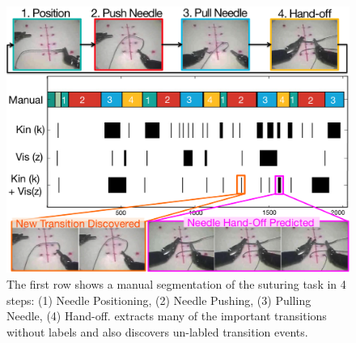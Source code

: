 
\begin{figure}[!ht]
    \centering
    \includegraphics[width=\linewidth]{tsc-experiments/suturing-v4}
    \caption{The first row shows a manual segmentation of the suturing task in 4 steps: (1) Needle Positioning, (2) Needle Pushing, (3) Pulling Needle, (4) Hand-off. \tsc extracts many of the important transitions without labels and also discovers un-labled transition events.
    \label{fig:suturing}}
\end{figure}


